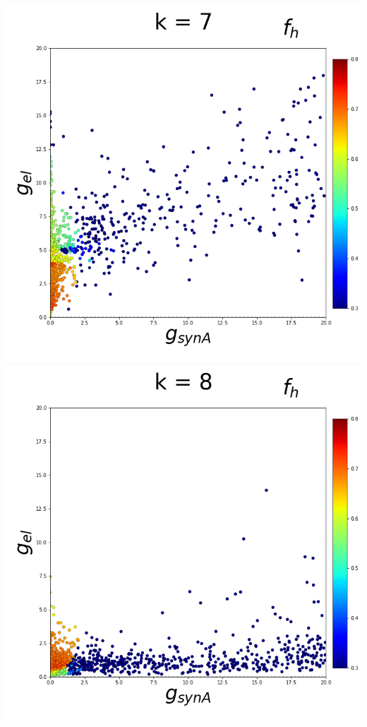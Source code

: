 \documentclass[11pt]{article}
\begin{document}
\begin{center}
\includegraphics[scale=0.125]{DSN_figs/STGCircuit_DSN_c=0_rs=2_k=7.png}
\includegraphics[scale=0.125]{DSN_figs/STGCircuit_DSN_c=0_rs=2_k=8.png}

\end{center}
\end{document}
